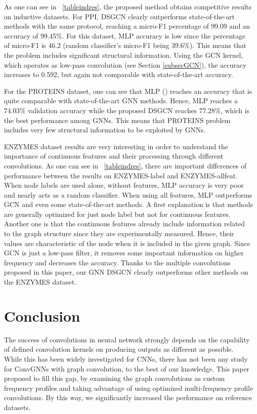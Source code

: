 \documentclass{article}
\begin{document}
As one can see in \tablename~\ref{tableindres}, the proposed method obtains competitive results on inductive datasets. For PPI, DSGCN clearly outperforms state-of-the-art methods with the same protocol, reaching a micro-F1 percentage of 99.09 and an accuracy of 99.45\%. For this dataset, MLP accuracy is low since the percentage of micro-F1 is 46.2 (random classifier's micro-F1 being 39.6\%). This means that the problem includes significant structural information. Using the GCN kernel, which operates as low-pass convolution (see Section \ref{subsecGCN}), the accuracy increases to 0.592, but again not comparable with state-of-the-art accuracy.

For the PROTEINS dataset, one can see that MLP () reaches an accuracy that is quite comparable with state-of-the-art GNN methods. Hence, MLP reaches a 74.03\% validation accuracy while the proposed DSGCN reaches 77.28\%, which is the best performance among GNNs. This means that PROTEINS problem includes very few structural information to be exploited by GNNs. 


ENZYMES dataset results are very interesting in order to understand the importance of continuous features and their processing through different convolutions. As one can see in \tablename~\ref{tableindres}, there are important differences of performance between the results on ENZYMES-label and ENZYMES-allfeat. When node labels are used alone, without features, MLP accuracy is very poor and nearly acts as a random classifier. When using all features, MLP outperforms GCN and even some state-of-the-art methods. A first explanation is that methods are generally optimized for just node label but not for continuous features. Another one is that the continuous features already include information related to the graph structure since they are experimentally measured. Hence, their values are characteristic of the node when it is included in the given graph. Since GCN is just a low-pass filter, it removes some important information on higher frequency and decreases the accuracy. Thanks to the multiple convolutions proposed in this paper, our GNN DSGCN clearly outperforms other methods on the ENZYMES dataset.


\section{Conclusion}

The success of convolutions in neural network strongly depends on the capability of defined convolution kernels on producing outputs as different as possible. While this has been widely investigated for CNNs, there has not been any study for ConvGNNs with graph convolution, to the best of our knowledge. This paper proposed to fill this gap, by examining the graph convolutions as custom frequency profiles and taking  
advantage of using optimized multi-frequency profile convolutions. By this way, we significantly increased the performance on reference datasets. 
\end{document}
